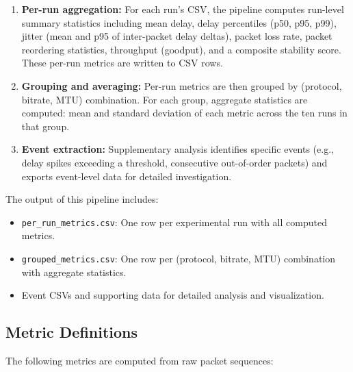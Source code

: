 \begin{enumerate}
    \item \textbf{Per-run aggregation:} For each run's CSV, the pipeline computes run-level summary statistics including mean delay, delay percentiles (p50, p95, p99), jitter (mean and p95 of inter-packet delay deltas), packet loss rate, packet reordering statistics, throughput (goodput), and a composite stability score. These per-run metrics are written to CSV rows.
    
    \item \textbf{Grouping and averaging:} Per-run metrics are then grouped by (protocol, bitrate, \ac{MTU}) combination. For each group, aggregate statistics are computed: mean and standard deviation of each metric across the ten runs in that group.
    
    \item \textbf{Event extraction:} Supplementary analysis identifies specific events (e.g., delay spikes exceeding a threshold, consecutive out-of-order packets) and exports event-level data for detailed investigation.
\end{enumerate}

The output of this pipeline includes:
\begin{itemize}
    \item \texttt{per\_run\_metrics.csv}: One row per experimental run with all computed metrics.
    \item \texttt{grouped\_metrics.csv}: One row per (protocol, bitrate, \ac{MTU}) combination with aggregate statistics.
    \item Event CSVs and supporting data for detailed analysis and visualization.
\end{itemize}

\subsection{Metric Definitions}
\label{sec:metric_definitions}
The following metrics are computed from raw packet sequences:


